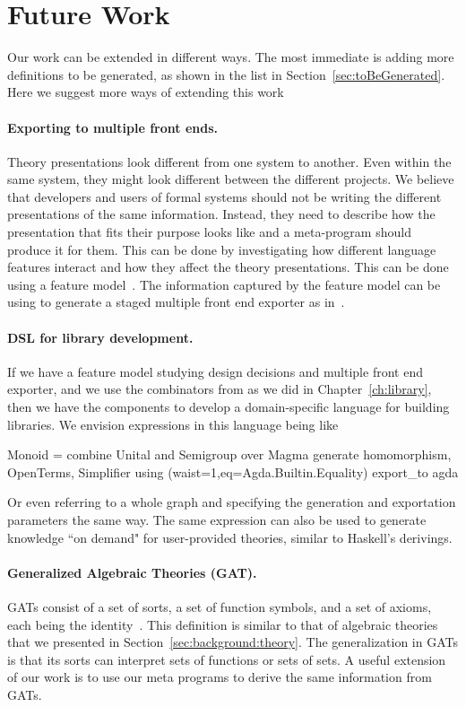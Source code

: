 \section{Future Work}
\label{future_work}
Our work can be extended in different ways. The most immediate is adding more definitions to be generated, as shown in the list in Section~\ref{sec:toBeGenerated}. Here we suggest more ways of extending this work 

\paragraph{Exporting to multiple front ends.} Theory presentations look different from one system to another. Even within the same system, they might look different between the different projects. We believe that developers and users of formal systems should not be writing the different presentations of the same information. Instead, they need to describe how the presentation that fits their purpose looks like and a meta-program should produce it for them. This can be done by investigating how different language features interact and how they affect the theory presentations. This can be done using a feature model~\cite{czarnecki2000generative}. The information captured by the feature model can be using to generate a staged multiple front end exporter as in~\cite{stagedConfig}. 

\paragraph{DSL for library development.}
If we have a feature model studying design decisions and multiple front end exporter, and we use the combinators from \cite{carette2018building} as we did in Chapter~\ref{ch:library}, then we have the components to develop a domain-specific language for building libraries. We envision expressions in this language being like
\begin{togcode}
Monoid = combine Unital and Semigroup over Magma
         generate homomorphism, OpenTerms, Simplifier
         using (waist=1,eq=Agda.Builtin.Equality)
         export_to agda 
\end{togcode} 
Or even referring to a whole graph and specifying the generation and exportation parameters the same way. 
The same expression can also be used to generate knowledge ``on demand" for user-provided theories, similar to Haskell's derivings. 

\paragraph{Generalized Algebraic Theories (GAT).}
GATs consist of a set of sorts, a set of function symbols, and a set of axioms, each being the identity~\cite{cartmell1986gats}. This definition is similar to that of algebraic theories that we presented in Section~\ref{sec:background:theory}. The generalization in GATs is that its sorts can interpret sets of functions or sets of sets. A useful extension of our work is to use our meta programs to derive the same information from GATs. 

